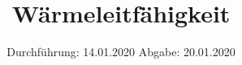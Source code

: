 

\subject{204}
\title{Wärmeleitfähigkeit}
\date{%
  Durchführung: 14.01.2020
  \hspace{3em}
  Abgabe: 20.01.2020
}



\maketitle
\thispagestyle{empty}
\tableofcontents
\newpage







\printbibliography{}


